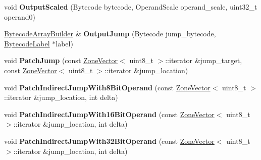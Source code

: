 \begin{DoxyCompactItemize}
\item 
void {\bfseries Output\+Scaled} (Bytecode bytecode, Operand\+Scale operand\+\_\+scale, uint32\+\_\+t operand0)\hypertarget{classv8_1_1internal_1_1interpreter_1_1_bytecode_array_builder_a485621cc268f216110d53a7d39b5082e}{}\label{classv8_1_1internal_1_1interpreter_1_1_bytecode_array_builder_a485621cc268f216110d53a7d39b5082e}

\item 
\hyperlink{classv8_1_1internal_1_1interpreter_1_1_bytecode_array_builder}{Bytecode\+Array\+Builder} \& {\bfseries Output\+Jump} (Bytecode jump\+\_\+bytecode, \hyperlink{classv8_1_1internal_1_1interpreter_1_1_bytecode_label}{Bytecode\+Label} $\ast$label)\hypertarget{classv8_1_1internal_1_1interpreter_1_1_bytecode_array_builder_ab459c5bc0752e672beba7da98f979e98}{}\label{classv8_1_1internal_1_1interpreter_1_1_bytecode_array_builder_ab459c5bc0752e672beba7da98f979e98}

\item 
void {\bfseries Patch\+Jump} (const \hyperlink{classv8_1_1internal_1_1_zone_vector}{Zone\+Vector}$<$ uint8\+\_\+t $>$\+::iterator \&jump\+\_\+target, const \hyperlink{classv8_1_1internal_1_1_zone_vector}{Zone\+Vector}$<$ uint8\+\_\+t $>$\+::iterator \&jump\+\_\+location)\hypertarget{classv8_1_1internal_1_1interpreter_1_1_bytecode_array_builder_a1d907ac161ddfeb9f29e125c2665a8cf}{}\label{classv8_1_1internal_1_1interpreter_1_1_bytecode_array_builder_a1d907ac161ddfeb9f29e125c2665a8cf}

\item 
void {\bfseries Patch\+Indirect\+Jump\+With8\+Bit\+Operand} (const \hyperlink{classv8_1_1internal_1_1_zone_vector}{Zone\+Vector}$<$ uint8\+\_\+t $>$\+::iterator \&jump\+\_\+location, int delta)\hypertarget{classv8_1_1internal_1_1interpreter_1_1_bytecode_array_builder_a548873797f1f3c417c9c7768aaeed3b2}{}\label{classv8_1_1internal_1_1interpreter_1_1_bytecode_array_builder_a548873797f1f3c417c9c7768aaeed3b2}

\item 
void {\bfseries Patch\+Indirect\+Jump\+With16\+Bit\+Operand} (const \hyperlink{classv8_1_1internal_1_1_zone_vector}{Zone\+Vector}$<$ uint8\+\_\+t $>$\+::iterator \&jump\+\_\+location, int delta)\hypertarget{classv8_1_1internal_1_1interpreter_1_1_bytecode_array_builder_ae11811da92be476d34156619862b1317}{}\label{classv8_1_1internal_1_1interpreter_1_1_bytecode_array_builder_ae11811da92be476d34156619862b1317}

\item 
void {\bfseries Patch\+Indirect\+Jump\+With32\+Bit\+Operand} (const \hyperlink{classv8_1_1internal_1_1_zone_vector}{Zone\+Vector}$<$ uint8\+\_\+t $>$\+::iterator \&jump\+\_\+location, int delta)\hypertarget{classv8_1_1internal_1_1interpreter_1_1_bytecode_array_builder_a2722102b0cd7a35491caf27a3dfb16fc}{}\label{classv8_1_1internal_1_1interpreter_1_1_bytecode_array_builder_a2722102b0cd7a35491caf27a3dfb16fc}


\end{DoxyCompactItemize}
